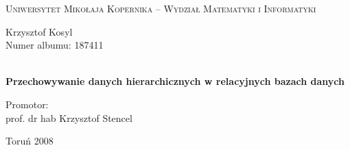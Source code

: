 


\begin{titlepage}
	\begin{center}
		\textsc{Uniwersytet Mikołaja Kopernika -- Wydział Matematyki i Informatyki}
	\end{center}

	\vfill

	\begin{flushleft}
		Krzysztof Kosyl\\
		Numer albumu: 187411
	\end{flushleft}

	\vfill\vfill

	\begin{center}
		\HRule \\[0.4cm]
		\huge{\textbf{Przechowywanie danych hierarchicznych w relacyjnych bazach danych}}
		\HRule \\[0.4cm]
	\end{center}

	\vfill\vfill\vfill\vfill

	\begin{flushright}
		Promotor:\\
		prof. dr hab Krzysztof Stencel
	\end{flushright}

	\vfill
	\begin{center}
		Toruń 2008
	\end{center}
\end{titlepage}
